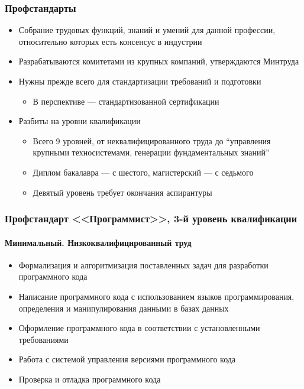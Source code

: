 \documentclass{../../slides-style}
\begin{document}
    \begin{frame}
        \frametitle{Профстандарты}
        \begin{itemize}
            \item Собрание трудовых функций, знаний и умений для данной профессии, относительно которых есть консенсус в индустрии
            \item Разрабатываются комитетами из крупных компаний, утверждаются Минтруда
            \item Нужны прежде всего для стандартизации требований и подготовки
            \begin{itemize}
                \item В перспективе --- стандартизованной сертификации
            \end{itemize}
            \item Разбиты на уровни квалификации
            \begin{itemize}
                \item Всего 9 уровней, от неквалифицированного труда до ``управления крупными техносистемами, генерации фундаментальных знаний''
                \item Диплом бакалавра --- с шестого, магистерский --- с седьмого
                \item Девятый уровень требует окончания аспирантуры
            \end{itemize}
        \end{itemize}
    \end{frame}

    \begin{frame}
        \frametitle{Профстандарт <<Программист>>, 3-й уровень квалификации}
        \framesubtitle{Минимальный. Низкоквалифицированный труд}
        \begin{itemize}
            \item Формализация и алгоритмизация поставленных задач для разработки программного кода
            \item Написание программного кода с использованием языков программирования, определения и манипулирования данными в базах данных
            \item Оформление программного кода в соответствии с установленными требованиями
            \item Работа с системой управления версиями программного кода
            \item Проверка и отладка программного кода
        \end{itemize}
    \end{frame}
\end{document}
